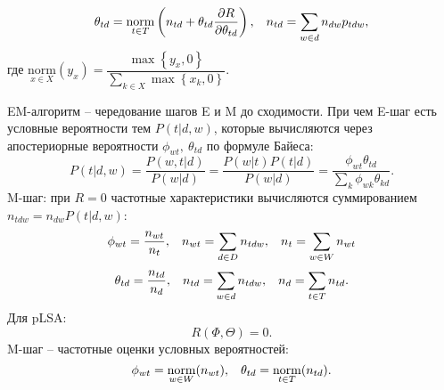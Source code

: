 \[\theta_{td} = \underset{t\in T}{\mathrm{norm}} \left(n_{td} + \theta_{td} \dfrac{\partial R}{\partial \theta_{td}}\right), \hspace*{0.3cm} n_{td} = \sum\limits_{w\in d} n_{dw} p_{tdw},\]
где $\underset{x\in X}{\mathrm{norm}} (y_x) = \dfrac{\max\left\{y_x, 0\right\}}{\sum\limits_{k\in X}\max\left\{x_k,0\right\}}.$
\bigskip\par
EM-алгоритм -- чередование шагов E и M до сходимости. При чем E-шаг есть условные вероятности тем $P(t|d, w)$, которые вычисляются через апостериорные вероятности $\phi_{wt}, \ \theta_{td}$ по формуле Байеса:
\[P(t|d,w) = \dfrac{P(w,t|d)}{P(w|d)} = \dfrac{P(w|t)P(t|d)}{P(w|d)} = \dfrac{\phi_{wt}\theta_{td}}{\sum\limits_{k}\phi_{wk}\theta_{kd}}.\]
M-шаг: при $R = 0$ частотные характеристики вычисляются суммированием $n_{tdw} = n_{dw} P(t|d, w)$:
\[\phi_{wt} = \dfrac{n_{wt}}{n_t}, \hspace*{0.3cm} n_{wt} = \sum\limits_{d\in D} n_{tdw}, \hspace*{0.3cm} n_t = \sum\limits_{w\in W} n_{wt}\]
\[\theta_{td} = \dfrac{n_{td}}{n_d}, \hspace*{0.3cm} n_{td} = \sum\limits_{w\in d} n_{tdw}, \hspace*{0.3cm} n_d = \sum\limits_{t\in T} n_{td}.\]
Для pLSA:
\[R(\Phi, \Theta) = 0.\]
M-шаг -- частотные оценки условных вероятностей:
\[\phi_{wt} = \underset{w\in W}{\mathrm{norm}}(n_{wt}), \hspace*{0.3cm} \theta_{td} = \underset{t\in T}{\mathrm{norm}}(n_{td}).\]

